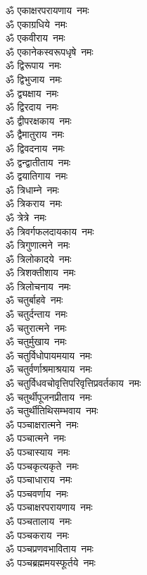 \begin{multicols}{2}
\begin{flushleft}
ॐ एकाक्षरपरायणाय~नमः\\
ॐ एकाग्रधिये~नमः\\
ॐ एकवीराय~नमः\\
ॐ एकानेकस्वरूपधृषे~नमः\\
ॐ द्विरूपाय~नमः\hfill{}\\
ॐ द्विभुजाय~नमः\\
ॐ द्व्यक्षाय~नमः\\
ॐ द्विरदाय~नमः\\
ॐ द्वीपरक्षकाय~नमः\\
ॐ द्वैमातुराय~नमः\\
ॐ द्विवदनाय~नमः\\
ॐ द्वन्द्वातीताय~नमः\\
ॐ द्वयातिगाय~नमः\\
ॐ त्रिधाम्ने~नमः\\
ॐ त्रिकराय~नमः\hfill{}\\
ॐ त्रेत्रे~नमः\\
ॐ त्रिवर्गफलदायकाय~नमः\\
ॐ त्रिगुणात्मने~नमः\\
ॐ त्रिलोकादये~नमः\\
ॐ त्रिशक्तीशाय~नमः\\
ॐ त्रिलोचनाय~नमः\\
ॐ चतुर्बाहवे~नमः\\
ॐ चतुर्दन्ताय~नमः\\
ॐ चतुरात्मने~नमः\\
ॐ चतुर्मुखाय~नमः\hfill{}\\
ॐ चतुर्विधोपायमयाय~नमः\\
ॐ चतुर्वर्णाश्रमाश्रयाय~नमः\\
ॐ चतुर्विधवचोवृत्तिपरिवृत्ति\-प्रवर्तकाय~नमः\\
ॐ चतुर्थीपूजनप्रीताय~नमः\\
ॐ चतुर्थीतिथिसम्भवाय~नमः\\
ॐ पञ्चाक्षरात्मने~नमः\\
ॐ पञ्चात्मने~नमः\\
ॐ पञ्चास्याय~नमः\\
ॐ पञ्चकृत्यकृते~नमः\\
ॐ पञ्चाधाराय~नमः\hfill{}\\
ॐ पञ्चवर्णाय~नमः\\
ॐ पञ्चाक्षरपरायणाय~नमः\\
ॐ पञ्चतालाय~नमः\\
ॐ पञ्चकराय~नमः\\
ॐ पञ्चप्रणवभाविताय~नमः\\
ॐ पञ्चब्रह्ममयस्फूर्तये~नमः\\

\end{flushleft}
\end{multicols}
